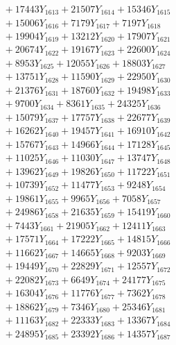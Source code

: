 \documentclass[a4paper,10pt]{article}
\begin{document}
{\begin{align}
&\;  + 17443 Y_{1613} + 21507 Y_{1614} + 15346 Y_{1615} \\[0.3ex]
&\;  + 15006 Y_{1616} + 7179 Y_{1617} + 7197 Y_{1618} \\[0.5ex]\allowbreak
&\;  + 19904 Y_{1619} + 13212 Y_{1620} + 17907 Y_{1621} \\[0.3ex]
&\;  + 20674 Y_{1622} + 19167 Y_{1623} + 22600 Y_{1624} \\[0.3ex]
&\;  + 8953 Y_{1625} + 12055 Y_{1626} + 18803 Y_{1627} \\[0.3ex]
&\;  + 13751 Y_{1628} + 11590 Y_{1629} + 22950 Y_{1630} \\[0.3ex]
&\;  + 21376 Y_{1631} + 18760 Y_{1632} + 19498 Y_{1633} \\[0.3ex]
&\;  + 9700 Y_{1634} + 8361 Y_{1635} + 24325 Y_{1636} \\[0.3ex]
&\;  + 15079 Y_{1637} + 17757 Y_{1638} + 22677 Y_{1639} \\[0.3ex]
&\;  + 16262 Y_{1640} + 19457 Y_{1641} + 16910 Y_{1642} \\[0.3ex]
&\;  + 15767 Y_{1643} + 14966 Y_{1644} + 17128 Y_{1645} \\[0.3ex]
&\;  + 11025 Y_{1646} + 11030 Y_{1647} + 13747 Y_{1648} \\[0.5ex]\allowbreak
&\;  + 13962 Y_{1649} + 19826 Y_{1650} + 11722 Y_{1651} \\[0.3ex]
&\;  + 10739 Y_{1652} + 11477 Y_{1653} + 9248 Y_{1654} \\[0.3ex]
&\;  + 19861 Y_{1655} + 9965 Y_{1656} + 7058 Y_{1657} \\[0.3ex]
&\;  + 24986 Y_{1658} + 21635 Y_{1659} + 15419 Y_{1660} \\[0.3ex]
&\;  + 7443 Y_{1661} + 21905 Y_{1662} + 12411 Y_{1663} \\[0.3ex]
&\;  + 17571 Y_{1664} + 17222 Y_{1665} + 14815 Y_{1666} \\[0.3ex]
&\;  + 11662 Y_{1667} + 14665 Y_{1668} + 9203 Y_{1669} \\[0.3ex]
&\;  + 19449 Y_{1670} + 22829 Y_{1671} + 12557 Y_{1672} \\[0.3ex]
&\;  + 22082 Y_{1673} + 6649 Y_{1674} + 24177 Y_{1675} \\[0.3ex]
&\;  + 16304 Y_{1676} + 11776 Y_{1677} + 7362 Y_{1678} \\[0.5ex]\allowbreak
&\;  + 18862 Y_{1679} + 7346 Y_{1680} + 25346 Y_{1681} \\[0.3ex]
&\;  + 11163 Y_{1682} + 22333 Y_{1683} + 13367 Y_{1684} \\[0.3ex]
&\;  + 24895 Y_{1685} + 23392 Y_{1686} + 14357 Y_{1687} \\[0.3ex]

\end{align}}
\end{document}
